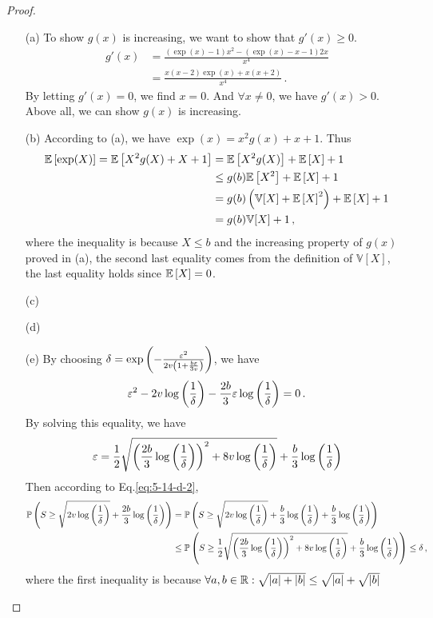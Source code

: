 \begin{proof}
	\begin{enumerate}
		\item[(a)] To show $g(x)$ is increasing, we want to show that $g'(x)\ge 0$. 
		\begin{align*}
			g'(x) &= \frac{(\exp(x)-1)x^2 - (\exp(x)-x-1)2x}{x^4} \\
			&= \frac{x(x-2)\exp(x)+x(x+2)}{x^4}\,.
		\end{align*}
		By letting $g'(x)=0$, we find $x=0$. And $\forall x\neq 0$, we have $g'(x)>0$. Above all, we can show $g(x)$ is increasing. 
		\item[(b)] According to (a), we have $\exp(x) = x^2 g(x)+x+1$. Thus 
		\begin{align*}
			\mathbb{E} \left[\exp(X)\right] = \mathbb{E} \left[ X^2 g(X)+X+1 \right] &= \mathbb{E} \left[X^2 g(X)\right]+\mathbb{E} \left[X\right]+1\\
			&\le g(b)\mathbb{E} \left[X^2\right]+\mathbb{E} \left[X\right]+1\\
			&= g(b) \left(\mathbb{V}[X]+\mathbb{E} \left[X\right]^2\right)+\mathbb{E} \left[X\right]+1 \\
			&= g(b)\mathbb{V}[X]+1\,,
		\end{align*}
		where the inequality is because $X\le b$ and the increasing property of $g(x)$ proved in (a), the second last equality comes from the definition of $\mathbb{V}[X]$, the last equality holds since $\mathbb{E} \left[X\right]=0$.
		\item[(c)]
		\item[(d)] 
		\item[(e)] 
		By choosing $\delta = \exp\left( -\frac{\varepsilon^2}{2v\left(1+\frac{b\varepsilon}{3v}\right)} \right)$, we have
		\begin{align*}
			\varepsilon^2 - 2v\log\left(\frac{1}{\delta}\right) - \frac{2b}{3}\varepsilon\log\left(\frac{1}{\delta}\right) = 0\,.
		\end{align*}
		By solving this equality, we have 
		\begin{align*}
			\varepsilon = \frac{1}{2}\sqrt{ \left(\frac{2b}{3}\log \left(\frac{1}{\delta}\right)\right)^2 + 8v\log \left(\frac{1}{\delta}\right)}+\frac{b}{3}\log \left(\frac{1}{\delta}\right)
		\end{align*}
		Then according to Eq.\eqref{eq:5-14-d-2}, 
		\begin{align*}
		\mathbb{P} \left(S \ge \sqrt{2v\log \left(\frac{1}{\delta}\right)}+\frac{2b}{3}\log \left(\frac{1}{\delta}\right)\right) &= \mathbb{P} \left(S \ge \sqrt{2v\log \left(\frac{1}{\delta}\right)}+\frac{b}{3}\log \left(\frac{1}{\delta}\right)+\frac{b}{3}\log \left(\frac{1}{\delta}\right)\right)\\
			&\le
			\mathbb{P} \left(S \ge \frac{1}{2}\sqrt{ \left(\frac{2b}{3}\log \left(\frac{1}{\delta}\right)\right)^2 + 8v\log \left(\frac{1}{\delta}\right)}+\frac{b}{3}\log \left(\frac{1}{\delta}\right)\right) \le \delta \,,
		\end{align*}
		where the first inequality is because $\forall a,b\in \mathbb{R}: \sqrt{|a|+|b|} \le \sqrt{|a|}+\sqrt{|b|}$




	\end{enumerate}
\end{proof}





